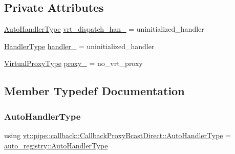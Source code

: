 \subsection*{Private Attributes}
\begin{DoxyCompactItemize}
\item 
\hyperlink{structvt_1_1pipe_1_1callback_1_1_callback_proxy_bcast_direct_a543cd86434430bd048952534f4fbc128}{Auto\+Handler\+Type} \hyperlink{structvt_1_1pipe_1_1callback_1_1_callback_proxy_bcast_direct_abbf88c330fa96ba4da3dae7f207a1641}{vrt\+\_\+dispatch\+\_\+han\+\_\+} = uninitialized\+\_\+handler
\item 
\hyperlink{namespacevt_af64846b57dfcaf104da3ef6967917573}{Handler\+Type} \hyperlink{structvt_1_1pipe_1_1callback_1_1_callback_proxy_bcast_direct_ab2e4eab888ffc3de18261f753f7e404a}{handler\+\_\+} = uninitialized\+\_\+handler
\item 
\hyperlink{namespacevt_a1b417dd5d684f045bb58a0ede70045ac}{Virtual\+Proxy\+Type} \hyperlink{structvt_1_1pipe_1_1callback_1_1_callback_proxy_bcast_direct_a7af23d7b32e39f4dbcfe35b5acb31f26}{proxy\+\_\+} = no\+\_\+vrt\+\_\+proxy
\end{DoxyCompactItemize}


\subsection{Member Typedef Documentation}
\mbox{\label{structvt_1_1pipe_1_1callback_1_1_callback_proxy_bcast_direct_a543cd86434430bd048952534f4fbc128}} 
\subsubsection{\texorpdfstring{Auto\+Handler\+Type}{AutoHandlerType}}
{\footnotesize\ttfamily using \hyperlink{structvt_1_1pipe_1_1callback_1_1_callback_proxy_bcast_direct_a543cd86434430bd048952534f4fbc128}{vt\+::pipe\+::callback\+::\+Callback\+Proxy\+Bcast\+Direct\+::\+Auto\+Handler\+Type} =  \hyperlink{namespacevt_1_1auto__registry_ae295e18699146815bb7d7674594d95d7}{auto\+\_\+registry\+::\+Auto\+Handler\+Type}}



